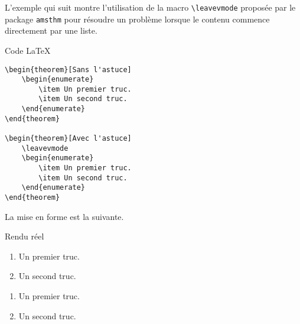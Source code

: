 L'exemple qui suit montre l'utilisation de la macro \verb+\leavevmode+ proposée par le package \verb+amsthm+ pour résoudre un problème lorsque le contenu commence directement par une liste.

\begin{frame-gene}{Code \LaTeX}
    \small
\begin{verbatim}
\begin{theorem}[Sans l'astuce]
    \begin{enumerate}
        \item Un premier truc.
        \item Un second truc.
    \end{enumerate}        
\end{theorem}

\begin{theorem}[Avec l'astuce]
    \leavevmode
    \begin{enumerate}
        \item Un premier truc.
        \item Un second truc.
    \end{enumerate}        
\end{theorem}
\end{verbatim}
\end{frame-gene}




La mise en forme est la suivante.

\begin{frame-gene}{Rendu réel}
    \small
\begin{theorem}
       \begin{enumerate}
        \item Un premier truc.
        \item Un second truc.
    \end{enumerate}        
\end{theorem}

\begin{theorem}
       \leavevmode
    \begin{enumerate}
        \item Un premier truc.
        \item Un second truc.
    \end{enumerate}        
\end{theorem}
\end{frame-gene}

